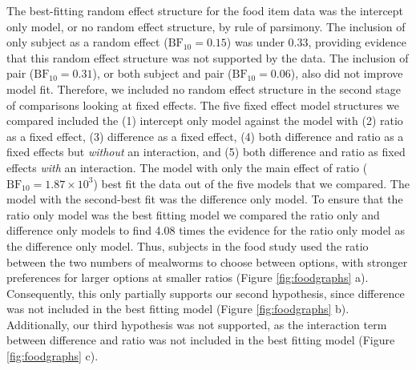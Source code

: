 \documentclass[
  ,doc,floatsintext]{apa6}
\begin{document}
The best-fitting random effect structure for the food item data was the intercept only model, or no random effect structure, by rule of parsimony. The inclusion of only subject as a random effect (\(\mathrm{BF}_{\textrm{10}} = 0.15\)) was under 0.33, providing evidence that this random effect structure was not supported by the data. The inclusion of pair (\(\mathrm{BF}_{\textrm{10}} = 0.31\)), or both subject and pair (\(\mathrm{BF}_{\textrm{10}} = 0.06\)), also did not improve model fit. Therefore, we included no random effect structure in the second stage of comparisons looking at fixed effects. The five fixed effect model structures we compared included the (1) intercept only model against the model with (2) ratio as a fixed effect, (3) difference as a fixed effect, (4) both difference and ratio as a fixed effects but \emph{without} an interaction, and (5) both difference and ratio as fixed effects \emph{with} an interaction. The model with only the main effect of ratio (\(\mathrm{BF}_{\textrm{10}} = 1.87 \times 10^{3}\)) best fit the data out of the five models that we compared. The model with the second-best fit was the difference only model. To ensure that the ratio only model was the best fitting model we compared the ratio only and difference only models to find 4.08 times the evidence for the ratio only model as the difference only model. Thus, subjects in the food study used the ratio between the two numbers of mealworms to choose between options, with stronger preferences for larger options at smaller ratios (Figure \ref{fig:foodgraphs} a). Consequently, this only partially supports our second hypothesis, since difference was not included in the best fitting model (Figure \ref{fig:foodgraphs} b). Additionally, our third hypothesis was not supported, as the interaction term between difference and ratio was not included in the best fitting model (Figure \ref{fig:foodgraphs} c).
\end{document}
